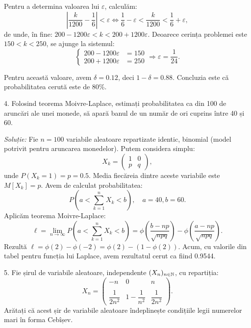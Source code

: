Pentru a determina valoarea lui $ \varepsilon $, calculăm:
\[
  \left| \dfrac{k}{1200} - \dfrac{1}{6} \right| < \varepsilon \Leftrightarrow %
  \dfrac{1}{6} - \varepsilon < \dfrac{k}{1200} < \dfrac{1}{6} + \varepsilon,
\]
de unde, în fine: $ 200 - 1200\varepsilon < k < 200 + 1200 \varepsilon $.
Deoarece cerința problemei este $ 150 < k < 250 $, se ajunge la sistemul:
\[
  \begin{cases}
    200 - 1200 \varepsilon &= 150 \\
    200 + 1200 \varepsilon &= 250
  \end{cases} \Rightarrow \varepsilon = \dfrac{1}{24}.
\]

Pentru această valoare, avem $ \delta = 0.12 $, deci $ 1 - \delta = 0.88 $.
Concluzia este că probabilitatea cerută este de 80\%.

\vspace{0.3cm}

4. Folosind teorema Moivre-Laplace, estimați probabilitatea ca din 100 de
aruncări ale unei monede, să apară banul de un număr de ori cuprins între
40 și 60.

\emph{Soluție:} Fie $ n = 100 $ variabile aleatoare repartizate identic,
binomial (model potrivit pentru aruncarea monedelor). Putem considera simplu:
\[
  X_k = \begin{pmatrix} 1 & 0 \\ p & q \end{pmatrix},
\]
unde $ P(X_k = 1) = p = 0.5 $. Media fiecăreia dintre aceste variabile este
$ M[X_k] = p $. Avem de calculat probabilitatea:
\[
  P \left( a < \sum_{k=1}^n X_k < b \right), \quad a = 40, b = 60.
\]
Aplicăm teorema Moivre-Laplace:
\[
  \ell = \lim_{n \to \infty} P \left( a < \sum_{k=1}^n X_k < b \right) = %
  \phi\left( \dfrac{b - np}{\sqrt{npq}} \right) - %
  \phi\left( \dfrac{a - np}{\sqrt{npq}} \right).
\]
Rezultă $ \ell = \phi(2) - \phi(-2) = \phi(2) - (1 - \phi(2)) $. Acum,
cu valorile din tabel pentru funcția lui Laplace, avem rezultatul cerut
ca fiind 0.9544.

\vspace{0.3cm}

5. Fie șirul de variabile aleatoare, independente $ (X_n)_{n \in \mathbb{N}} $, cu
repartiția:
\[
  X_n = \begin{pmatrix}
    -n & 0 & n \\
    & & \\
    \dfrac{1}{2n^2} & 1 - \dfrac{1}{n^2} & \dfrac{1}{2n^2}
  \end{pmatrix}.
\]
Arătați că acest șir de variabile aleatoare îndeplinește condițiile legii
numerelor mari în forma Cebîșev.

